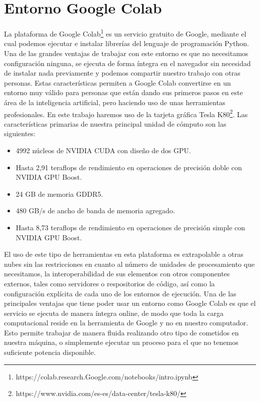 \section{Entorno Google Colab}\label{sec:entorno-Google-colab}
La plataforma de Google Colab\footnote{https://colab.research.Google.com/notebooks/intro.ipynb} es un servicio gratuito de Google, mediante el cual podemos ejecutar e instalar librerías del lenguaje de programación Python.
Una de las grandes ventajas de trabajar con este entorno es que no necesitamos configuración ninguna, se ejecuta de forma íntegra en el navegador sin necesidad de instalar nada previamente y podemos compartir
nuestro trabajo con otras personas.
Estas características permiten a Google Colab convertirse en un entorno muy válido para personas que están dando sus primeros pasos en este área de la inteligencia artificial, pero haciendo uso
de unas herramientas profesionales.
En este trabajo haremos uso de la tarjeta gráfica Tesla K80\footnote{https://www.nvidia.com/es-es/data-center/tesla-k80/}.
Las características primarias de nuestra principal unidad de cómputo son las siguientes:
\begin{itemize}
    \item 4992 núcleos de NVIDIA CUDA con diseño de dos GPU\@.
    \item Hasta 2,91 teraflops de rendimiento en operaciones de precisión doble con NVIDIA GPU Boost.
    \item 24 GB de memoria GDDR5.
    \item 480 GB/s de ancho de banda de memoria agregado.
    \item Hasta 8,73 teraflops de rendimiento en operaciones de precisión simple con NVIDIA GPU Boost.
\end{itemize}

El uso de este tipo de herramientas en esta plataforma es extrapolable a otras nubes sin las restricciones en cuanto al número de unidades de procesamiento que necesitamos, la interoperabilidad de sus elementos con otros componentes externos, tales como servidores o respositorios de código, así como la configuración explícita de cada uno de los entornos de ejecución.
Una de las principales ventajas que tiene poder usar un entorno como Google Colab es que el servicio se ejecuta de manera íntegra online, de modo que toda la carga computacional reside en la herramienta de Google y no en nuestro computador.
Esto permite trabajar de manera fluida realizando otro tipo de cometidos en nuestra máquina, o simplemente ejecutar un proceso para el que no tenemos suficiente potencia disponible.
